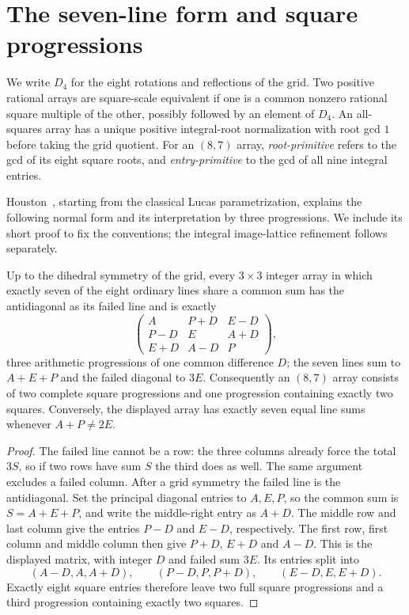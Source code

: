\section{The seven-line form and square progressions}\label{sec:normalform}

We write $D_4$ for the eight rotations and reflections of the grid. Two
positive rational arrays are square-scale equivalent if one is a common
nonzero rational square multiple of the other, possibly followed by an
element of $D_4$. An all-squares array has a unique positive integral-root
normalization with root gcd $1$ before taking the grid quotient. For an
$(8,7)$ array, \emph{root-primitive} refers to the gcd of its eight square
roots, and \emph{entry-primitive} to the gcd of all nine integral entries.

Houston~\cite{HOU16A,HOU16B}, starting from the classical Lucas
parametrization, explains the following normal form and its interpretation
by three progressions. We include its short proof to fix the conventions;
the integral image-lattice refinement follows separately.


\begin{theorem}\label{main:normalform}
Up to the dihedral symmetry of the grid, every $3\times3$ integer array in
which exactly seven of the eight ordinary lines share a common sum has the
antidiagonal as its failed line and is exactly
\[
\begin{pmatrix} A & P+D & E-D\\ P-D & E & A+D\\ E+D & A-D & P\end{pmatrix},
\]
three arithmetic progressions of one common difference $D$; the seven lines
sum to $A+E+P$ and the failed diagonal to $3E$. Consequently an $(8,7)$
array consists of two complete square progressions and one progression
containing exactly two squares. Conversely, the displayed array has
exactly seven equal line sums whenever $A+P\ne2E$.
\end{theorem}

\begin{proof}
The failed line cannot be a row: the three columns already force the total
$3S$, so if two rows have sum $S$ the third does as well. The same argument
excludes a failed column. After a grid symmetry the failed line is the
antidiagonal. Set the principal diagonal entries to $A,E,P$, so the common
sum is $S=A+E+P$, and write the middle-right entry as $A+D$. The middle
row and last column give the entries $P-D$ and $E-D$, respectively.
The first row, first column and middle column then give $P+D$, $E+D$ and
$A-D$. This is the displayed matrix, with integer $D$ and failed sum
$3E$. Its entries split into
\[
(A-D,A,A+D),\qquad(P-D,P,P+D),\qquad(E-D,E,E+D).
\]
Exactly eight square entries therefore leave two full square progressions
and a third progression containing exactly two squares.
\end{proof}

